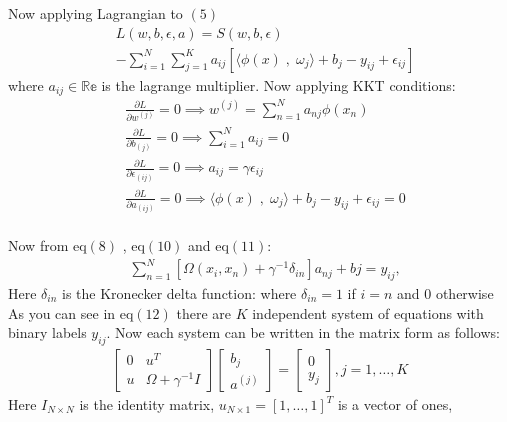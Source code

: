 \documentclass[conference]{IEEEtran}
\begin{document}
    Now applying Lagrangian to $(5)$
    \begin{align*}
        &L(w,b,\epsilon,a) = S(w,b,\epsilon)\\
        &- \sum_{i=1}^{N} \sum_{j=1}^{K} a_{ij}[\langle \phi(x) \;,\; \omega_{j}  \rangle + b_{j} - y_{ij} + \epsilon_{ij}]
    \end{align*}
    where $a_{ij} \in \mathbb{Re}$ is the lagrange multiplier.
    Now applying KKT conditions:
    \begin{align}
        &\frac{{\partial L}}{{\partial w^{(j)}}} = 0 \implies w^{(j)} = \sum_{n=1}^{N}a_{nj}\phi(x_{n}) \\
        &\frac{{\partial L}}{{\partial b_{(j)}}} = 0 \implies \sum_{i=1}^{N}a_{ij} = 0 \\
        &\frac{{\partial L}}{{\partial \epsilon_{(ij)}}} = 0 \implies
        a_{ij} = \gamma \epsilon_{ij} \\
        &\frac{{\partial L}}{{\partial a_{(ij)}}} = 0 \implies
        \langle \phi(x) \;,\; \omega_{j}  \rangle + b_{j} - y_{ij} + \epsilon_{ij} = 0
    \end{align}
    \\
    Now from eq$(8)$ , eq$(10)$ and eq$(11)$:
    \begin{align}
        &\sum_{n=1}^{N} [\Omega(x_{i},x_{n}) + \gamma^{-1}\delta_{in}]a_{nj} + b{j} = y_{ij},
    \end{align}
    Here $\delta_{in}$ is the Kronecker delta function: where $\delta_{in} =1$ if $i=n$ and $0$ otherwise \\
    As you can see in eq$(12)$ there are $K$ independent system of equations with binary labels $y_{ij}$.
    Now each system can be written in the matrix form as follows:
    \begin{align}
        \begin{bmatrix}
            0 & u^{T}                 \\
            u & \Omega + \gamma^{-1}I
        \end{bmatrix}
        \begin{bmatrix}
            b_{j} \\
            a^{(j)}
        \end{bmatrix}
        =
        \begin{bmatrix}
            0 \\
            y_{j}
        \end{bmatrix}
        , j = 1,\ldots,K
    \end{align}
    Here $I_{N \times N}$ is the identity matrix, $u_{N \times 1} = [1,\ldots,1]^{T}$ is a vector of ones,
\end{document}
